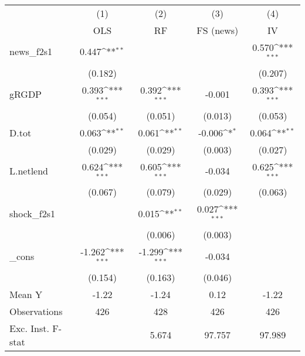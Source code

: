 {
\def\sym#1{\ifmmode^{#1}\else\(^{#1}\)\fi}
\begin{tabular}{l*{4}{c}}
\toprule
            &\multicolumn{1}{c}{(1)}&\multicolumn{1}{c}{(2)}&\multicolumn{1}{c}{(3)}&\multicolumn{1}{c}{(4)}\\
            &\multicolumn{1}{c}{OLS}&\multicolumn{1}{c}{RF}&\multicolumn{1}{c}{FS (news)}&\multicolumn{1}{c}{IV}\\
\midrule
news\_f2s1   &       0.447\sym{**} &                     &                     &       0.570\sym{***}\\
            &     (0.182)         &                     &                     &     (0.207)         \\
\addlinespace
gRGDP       &       0.393\sym{***}&       0.392\sym{***}&      -0.001         &       0.393\sym{***}\\
            &     (0.054)         &     (0.051)         &     (0.013)         &     (0.053)         \\
\addlinespace
D.tot       &       0.063\sym{**} &       0.061\sym{**} &      -0.006\sym{*}  &       0.064\sym{**} \\
            &     (0.029)         &     (0.029)         &     (0.003)         &     (0.027)         \\
\addlinespace
L.netlend   &       0.624\sym{***}&       0.605\sym{***}&      -0.034         &       0.625\sym{***}\\
            &     (0.067)         &     (0.079)         &     (0.029)         &     (0.063)         \\
\addlinespace
shock\_f2s1  &                     &       0.015\sym{**} &       0.027\sym{***}&                     \\
            &                     &     (0.006)         &     (0.003)         &                     \\
\addlinespace
\_cons      &      -1.262\sym{***}&      -1.299\sym{***}&      -0.034         &                     \\
            &     (0.154)         &     (0.163)         &     (0.046)         &                     \\
\midrule
Mean Y      &       -1.22         &       -1.24         &        0.12         &       -1.22         \\
Observations&         426         &         428         &         426         &         426         \\
Exc. Inst. F-stat&                     &       5.674         &      97.757         &      97.989         \\
\bottomrule
\end{tabular}
}
